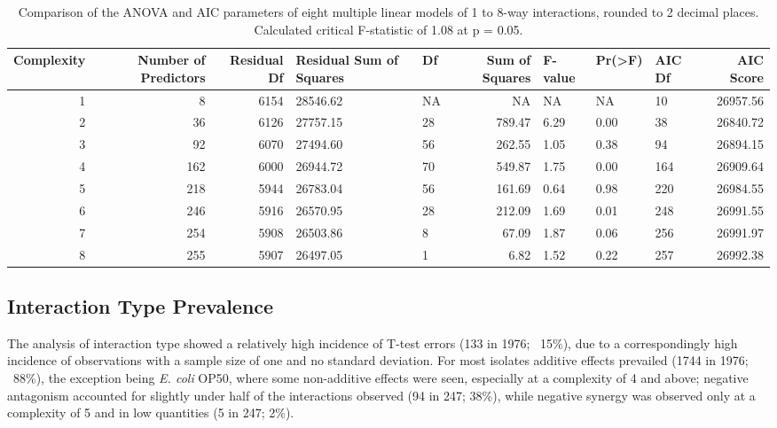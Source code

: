 \documentclass[final,1p,times]{elsarticle}
\begin{document}
\begin{table}[H]
\centering
\scriptsize
\begin{tabular}{N N N P O N O O O N}
\toprule 
\textbf{Complexity} & \textbf{Number of Predictors} & \textbf{Residual Df} & \textbf{Residual Sum of Squares} & \textbf{Df} & \textbf{Sum of Squares} & \textbf{F-value} & \textbf{Pr(>F)} & \textbf{AIC Df} & \textbf{AIC Score}  \\
\midrule
{}1 & 8   & 6154 & 28546.62 & NA & NA     & NA   & NA   & 10  & 26957.56 \\
2 & 36  & 6126 & 27757.15 & 28 & 789.47 & 6.29 & 0.00 & 38  & 26840.72 \\
3 & 92  & 6070 & 27494.60 & 56 & 262.55 & 1.05 & 0.38 & 94  & 26894.15 \\
4 & 162 & 6000 & 26944.72 & 70 & 549.87 & 1.75 & 0.00 & 164 & 26909.64 \\
5 & 218 & 5944 & 26783.04 & 56 & 161.69 & 0.64 & 0.98 & 220 & 26984.55 \\
6 & 246 & 5916 & 26570.95 & 28 & 212.09 & 1.69 & 0.01 & 248 & 26991.55 \\
7 & 254 & 5908 & 26503.86 & 8  & 67.09  & 1.87 & 0.06 & 256 & 26991.97 \\
8 & 255 & 5907 & 26497.05 & 1  & 6.82   & 1.52 & 0.22 & 257 & 26992.38 \\     
\bottomrule
\end{tabular}
\caption{Comparison of the ANOVA and AIC parameters of eight multiple linear models of 1 to 8-way interactions, rounded to 2 decimal places. Calculated critical F-statistic of 1.08 at p = 0.05.}
\label{tab:lmodels}
\end{table}

\newpage
\subsection{Interaction Type Prevalence}
\label{S:3:7}

The analysis of interaction type showed a relatively high incidence of T-test errors (133 in 1976; ~15\%), due to a correspondingly high incidence of observations with a sample size of one and no standard deviation. For most isolates additive effects prevailed (1744 in 1976; ~88\%), the exception being \textit{E. coli} OP50, where some non-additive effects were seen, especially at a complexity of 4 and above; negative antagonism accounted for slightly under half of the interactions observed (94 in 247; 38\%), while negative synergy was observed only at a complexity of 5 and in low quantities (5 in 247; 2\%).
\end{document}
